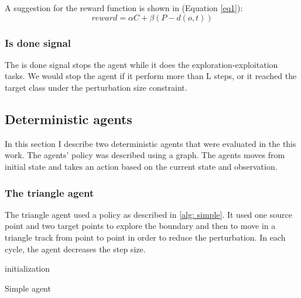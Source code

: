 \documentclass{article}
\begin{document}
A suggestion for the reward function is shown in (Equation \ref{eq1}):
\begin{equation} \label{eq1}
reward = \alpha C + \beta  \left (P-d\left ( o, t \right )  \right )
\end{equation}

\subsubsection{Is done signal}
The is done signal stops the agent while it does the exploration-exploitation tasks. We would stop the agent if it perform more than L steps, or it reached the target class under the perturbation size constraint.

\subsection{Deterministic agents}
In this section I describe two deterministic agents that were evaluated in the this work. The agents' policy was described using a graph. The agents moves from initial state and takes an action based on the current state and observation.


\subsubsection{The triangle agent}
The triangle agent used a policy as described in \ref{alg: simple}. It used one source point and two target points to explore the boundary and then to move in a triangle track from point to point in order to reduce the perturbation. In each cycle, the agent decreases the step size.

\begin{algorithm}[H] \label{alg:simple}
\SetAlgoLined
{}
 initialization\;
 \caption{Simple agent}
\end{algorithm}
\end{document}
